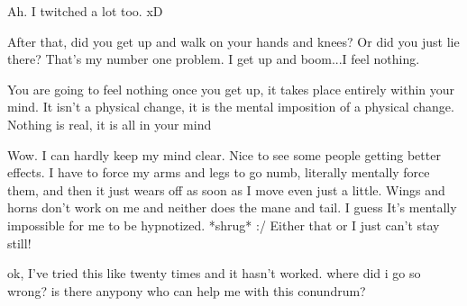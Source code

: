 \documentclass[ebook,12pt,oneside,openany]{memoir}
\newcommand{\mytexttilde}{\raisebox{0.5ex}{\texttildelow}}
\begin{document}
\begin{tcolorbox}[title=\mytexttilde{}Lawful Sturdy Wing\mytexttilde{},colback=magenta!5!white,colframe=magenta!75!black,coltitle=white]
\begin{tcolorbox}[title=Feather Gem]
\par{Ah.  I twitched a lot too.  xD}
\par{After that, did you get up and walk on your hands and knees?  Or did you just lie there?  That's my number one problem.  I get up and boom...I feel nothing.}
\end{tcolorbox}
\par{You are going to feel nothing once you get up, it takes place entirely within your mind. It isn't a physical change, it is the mental imposition of a physical change. Nothing is real, it is all in your mind}
\end{tcolorbox}
\begin{tcolorbox}[title=Scarletthealicorn,colback=lime!5!white,colframe=lime!75!black,coltitle=white]
\par{Wow. I can hardly keep my mind clear. Nice to see some people getting better effects. I have to force my arms and legs to go numb, literally mentally force them, and then it just wears off as soon as I move even just a little. Wings and horns don't work on me and neither does the mane and tail. I guess It's mentally impossible for me to be hypnotized. *shrug* :/ Either that or I just can't stay still!}
\end{tcolorbox}
\begin{tcolorbox}[title=Toby]
\par{ok, I've tried this like twenty times and it hasn't worked. where did i go so wrong? is there anypony who can help me with this conundrum?}
\end{tcolorbox}
\end{document}
